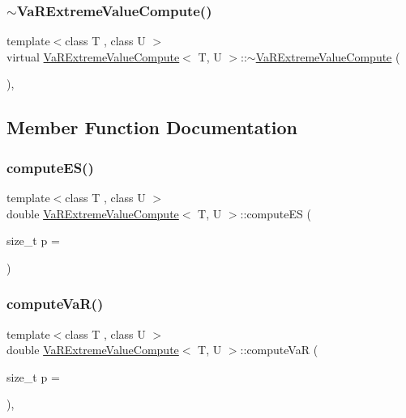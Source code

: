 \subsubsection{\texorpdfstring{$\sim$\+Va\+R\+Extreme\+Value\+Compute()}{~VaRExtremeValueCompute()}}
{\footnotesize\ttfamily template$<$class T , class U $>$ \\
virtual \hyperlink{classVaRExtremeValueCompute}{Va\+R\+Extreme\+Value\+Compute}$<$ T, U $>$\+::$\sim$\hyperlink{classVaRExtremeValueCompute}{Va\+R\+Extreme\+Value\+Compute} (\begin{DoxyParamCaption}{ }\end{DoxyParamCaption})\hspace{0.3cm}{\ttfamily [inline]}, {\ttfamily [virtual]}}



\subsection{Member Function Documentation}
\hypertarget{classVaRExtremeValueCompute_afa071fb24b112d282847f8ad6732060f}{}\label{classVaRExtremeValueCompute_afa071fb24b112d282847f8ad6732060f} 
\subsubsection{\texorpdfstring{compute\+E\+S()}{computeES()}}
{\footnotesize\ttfamily template$<$class T , class U $>$ \\
double \hyperlink{classVaRExtremeValueCompute}{Va\+R\+Extreme\+Value\+Compute}$<$ T, U $>$\+::compute\+ES (\begin{DoxyParamCaption}\item[{size\+\_\+t}]{p = {} }\end{DoxyParamCaption})\hspace{0.3cm}{\ttfamily [inline]}}

\hypertarget{classVaRExtremeValueCompute_aa0a5cedce7a1a0dc0298f5b59add0e2c}{}\label{classVaRExtremeValueCompute_aa0a5cedce7a1a0dc0298f5b59add0e2c} 
\subsubsection{\texorpdfstring{compute\+Va\+R()}{computeVaR()}}
{\footnotesize\ttfamily template$<$class T , class U $>$ \\
double \hyperlink{classVaRExtremeValueCompute}{Va\+R\+Extreme\+Value\+Compute}$<$ T, U $>$\+::compute\+VaR (\begin{DoxyParamCaption}\item[{size\+\_\+t}]{p = {} }\end{DoxyParamCaption})\hspace{0.3cm}{\ttfamily [inline]}, {\ttfamily [virtual]}}




